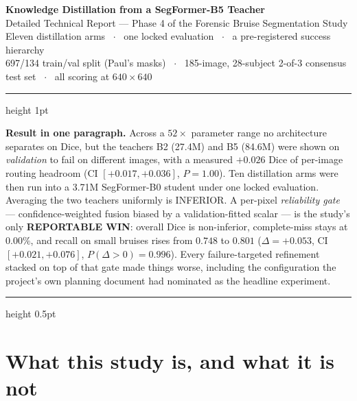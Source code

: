 \documentclass[11pt]{article}
\newcommand{\win}[1]{\textcolor{wingreen}{\textbf{#1}}}
\newcommand{\lose}[1]{\textcolor{losered}{#1}}
\begin{document}
\begin{center}
  {\LARGE\bfseries Knowledge Distillation from a SegFormer-B5 Teacher}\\[6pt]
  {\large Detailed Technical Report --- Phase 4 of the Forensic Bruise Segmentation Study}\\[7pt]
  {\small Eleven distillation arms \, $\cdot$ \, one locked evaluation \, $\cdot$ \,
   a pre-registered success hierarchy}\\[4pt]
  {\footnotesize 697/134 train/val split (Paul's masks) \ $\cdot$ \ 185-image, 28-subject
   2-of-3 consensus test set \ $\cdot$ \ all scoring at $640\times640$}
\end{center}

\vspace{4pt}
{\color{rulegray}\hrule height 1pt}
\vspace{6pt}

\begin{keybox}
\textbf{Result in one paragraph.} Across a $52\times$ parameter range no architecture separates
on Dice, but the teachers B2 (27.4M) and B5 (84.6M) were shown on \emph{validation} to fail on
different images, with a measured $+0.026$ Dice of per-image routing headroom (CI
$[+0.017,+0.036]$, $P=1.00$). Ten distillation arms were then run into a 3.71M SegFormer-B0
student under one locked evaluation. Averaging the two teachers uniformly is \lose{INFERIOR}. A
per-pixel \emph{reliability gate} --- confidence-weighted fusion biased by a validation-fitted
scalar --- is the study's only \win{REPORTABLE WIN}: overall Dice is non-inferior, complete-miss
stays at $0.00\%$, and recall on small bruises rises from $0.748$ to $0.801$
($\Delta=+0.053$, CI $[+0.021,+0.076]$, $P(\Delta>0)=0.996$). Every failure-targeted refinement
stacked on top of that gate made things worse, including the configuration the project's own
planning document had nominated as the headline experiment.
\end{keybox}

\vspace{2pt}
\tableofcontents
\vspace{6pt}
{\color{rulegray}\hrule height 0.5pt}

\section{What this study is, and what it is not}
\end{document}
